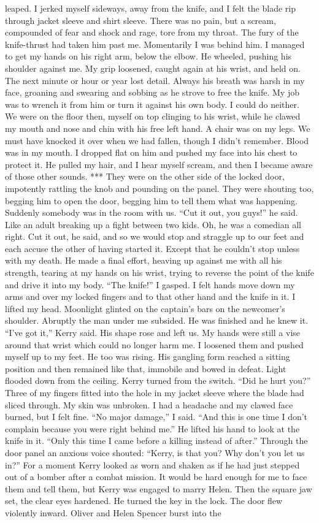 \documentclass{novel}
\begin{document}
leaped. I jerked myself sideways, away from the knife, and I felt the blade rip through jacket sleeve and shirt sleeve. There was no pain, but a scream, compounded of fear and shock and rage, tore from my throat. The fury of the knife-thrust had taken him past me. Momentarily I was behind him. I managed to get my hands on his right arm, below the elbow. He wheeled, pushing his shoulder against me. My grip loosened, caught again at his wrist, and held on. The next minute or hour or year lost detail. Always his breath was harsh in my face, groaning and swearing and sobbing as he strove to free the knife. My job was to wrench it from him or turn it against his own body. I could do neither. We were on the floor then, myself on top clinging to his wrist, while he clawed my mouth and nose and chin with his free left hand. A chair was on my legs. We must have knocked it over when we had fallen, though I didn’t remember. Blood was in my mouth. I dropped flat on him and pushed my face into his chest to protect it. He pulled my hair, and I hear myself scream, and then I became aware of those other sounds. *** They were on the other side of the locked door, impotently rattling the knob and pounding on the panel. They were shouting too, begging him to open the door, begging him to tell them what was happening. Suddenly somebody was in the room with us. “Cut it out, you guys!” he said. Like an adult breaking up a fight between two kids. Oh, he was a comedian all right. Cut it out, he said, and so we would stop and straggle up to our feet and each accuse the other of having started it. Except that he couldn’t stop unless with my death. He made a final effort, heaving up against me with all his strength, tearing at my hands on his wrist, trying to reverse the point of the knife and drive it into my body. “The knife!” I gasped. I felt hands move down my arms and over my locked fingers and to that other hand and the knife in it. I lifted my head. Moonlight glinted on the captain’s bars on the newcomer’s shoulder. Abruptly the man under me subsided. He was finished and he knew it. “I’ve got it,” Kerry said. His shape rose and left us. My hands were still a vise around that wrist which could no longer harm me. I loosened them and pushed myself up to my feet. He too was rising. His gangling form reached a sitting position and then remained like that, immobile and bowed in defeat. Light flooded down from the ceiling. Kerry turned from the switch. “Did he hurt you?” Three of my fingers fitted into the hole in my jacket sleeve where the blade had sliced through. My skin was unbroken. I had a headache and my clawed face burned, but I felt fine. “No major damage,” I said. “And this is one time I don’t complain because you were right behind me.” He lifted his hand to look at the knife in it. “Only this time I came before a killing instead of after.” Through the door panel an anxious voice shouted: “Kerry, is that you? Why don’t you let us in?” For a moment Kerry looked as worn and shaken as if he had just stepped out of a bomber after a combat mission. It would be hard enough for me to face them and tell them, but Kerry was engaged to marry Helen. Then the square jaw set, the clear eyes hardened. He turned the key in the lock. The door flew violently inward. Oliver and Helen Spencer burst into the 
\end{document}
